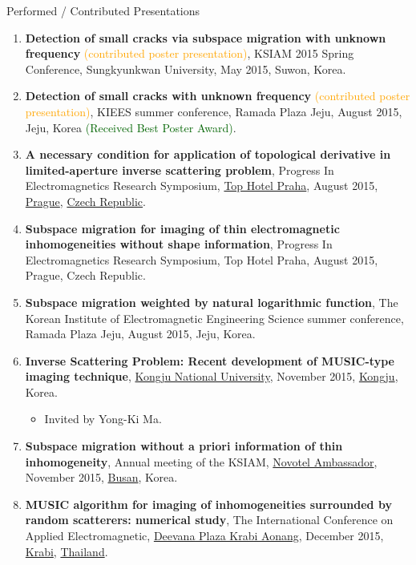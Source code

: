 \documentclass{resume} %
\begin{document}
\begin{rSection}{Performed / Contributed Presentations}
\begin{enumerate}
\item\label{P-KSIAM2015B} \textbf{Detection of small cracks via subspace migration with unknown frequency} \textcolor{orange}{(contributed poster presentation)}, KSIAM 2015 Spring Conference, Sungkyunkwan University, May 2015, Suwon, Korea.
\item\label{P-KIEES2015B} \textbf{Detection of small cracks with unknown frequency} \textcolor{orange}{(contributed poster presentation)}, KIEES summer conference, Ramada Plaza Jeju, August 2015, Jeju, Korea \textcolor{darkgreen}{(Received Best Poster Award)}.
\item\label{P-PIERS2015A} \textbf{A necessary condition for application of topological derivative in limited-aperture inverse scattering problem}, Progress In Electromagnetics Research Symposium, \href{https://www.tophotel.cz}{Top Hotel Praha}, August 2015, \href{https://www.praha.eu/jnp/en/index.html}{Prague}, \href{https://www.visitczechrepublic.com/en-US}{Czech Republic}.
\item\label{P-PIERS2015B} \textbf{Subspace migration for imaging of thin electromagnetic inhomogeneities without shape information}, Progress In Electromagnetics Research Symposium, Top Hotel Praha, August 2015, Prague, Czech Republic.
\item\label{P-PIERS2015C} \textbf{Subspace migration weighted by natural logarithmic function}, The Korean Institute of Electromagnetic Engineering Science summer conference, Ramada Plaza Jeju, August 2015, Jeju, Korea.
\item\label{P-KONGJU2015} \textbf{Inverse Scattering Problem: Recent development of MUSIC-type imaging technique}, \href{http://www.kongju.ac.kr/}{Kongju National University}, November 2015, \href{https://www.gongju.go.kr}{Kongju}, Korea.
\begin{itemize}
\item Invited by Yong-Ki Ma.
\end{itemize}
\item\label{P-KSIAM2015C} \textbf{Subspace migration without a priori information of thin inhomogeneity}, Annual meeting of the KSIAM, \href{https://novotel.ambatel.com/busan/main.amb/}{Novotel Ambassador}, November 2015, \href{http://english.busan.go.kr/index}{Busan}, Korea.
\item\label{P-APPEIC2015} \textbf{MUSIC algorithm for imaging of inhomogeneities surrounded by random scatterers: numerical study}, The  International Conference on Applied Electromagnetic, \href{http://www.deevanaplazakrabi.com/}{Deevana Plaza Krabi Aonang}, December 2015, \href{https://en.wikipedia.org/wiki/Krabi}{Krabi}, \href{https://www.thaigov.go.th}{Thailand}.

\end{enumerate}
\end{rSection}
\end{document}
